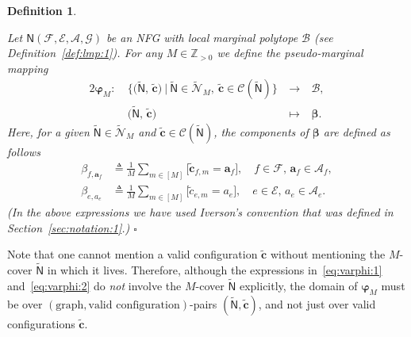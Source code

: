 \documentclass[journal, twocolumn]{IEEEtran}
\renewcommand{\mathbf}[1]{{\bm{#1}}}
\newcommand{\Z}{\mathbb{Z}}
\newcommand{\Zpp}{\Z_{>0}}
\newcommand{\vect}[1]{\mathbf{#1}}
\newcommand{\code}[1]{\mathcal{#1}}
\newcommand{\set}[1]{\mathcal{#1}}
\newcommand{\graph}[1]{\mathsf{#1}}
\newcommand{\defeq}{\triangleq}
\newcommand{\codeCedge}{\code{C}}
\newcommand{\bel}{\beta}
\newcommand{\vbel}{\boldsymbol{\bel}}
\newcommand{\setA}{\set{A}}
\newcommand{\setE}{\set{E}}
\newcommand{\setF}{\set{F}}
\newcommand{\setG}{\set{G}}
\newcommand{\va}{\vect{a}}
\newcommand{\cc}{\cover{c}}
\newcommand{\cvc}{\vect{\cover{c}}}
\newcommand{\lmpB}{\mathcal{B}}
\newcommand{\graphN}{\graph{N}}
\newcommand{\cover}[1]{\tilde{#1}}
\newcommand{\cset}[1]{\cover{\set{#1}}}
\newcommand{\cgraph}[1]{\cover{\graph{#1}}}
\newcommand{\?}{\mathrm{?}}
\newcommand{\varphiM}{\boldsymbol{\varphi}_{M}}
\newcommand{\qedwhite}{\hspace*{\fill}%
  $\square$\smallskip}
\newcommand{\defend}{\qedwhite}
\newtheorem{Definition}[Lemma]{Definition}
\begin{document}
\begin{Definition}
  \label{def:down:projection:1}

  Let $\graphN(\setF,\setE, \setA, \setG)$ be an NFG with local marginal
  polytope $\lmpB$ (see Definition~\ref{def:lmp:1}). For any $M \in \Zpp$ we
  define the pseudo-marginal mapping
  \begin{alignat*}{2}
    \varphiM: \ 
    &
    \Big\{
      \big(
        \cgraph{N}, \, 
        \cvc
      \big)
      \ \Big| \ 
        \cgraph{N} \in \cset{N}_{M}, \ 
        \cvc \in \codeCedge(\cgraph{N})
    \Big\}
      &\ \to \ & \lmpB, \\
    &
    \big(
      \cgraph{N}, \,
      \cvc
    \big)
      &\ \mapsto\ &
         \vbel.
  \end{alignat*}
  Here, for a given $\cgraph{N} \in \cset{N}_M$ and $\cvc \in
  \codeCedge(\cgraph{N})$, the components of $\vbel$ are defined as
  follows
  \begin{align}
    \bel_{f, \va_f}
      &\defeq
         \frac{1}{M}
         \sum_{m \in [M]}
           \big[ \cvc_{f,m} \! = \! \va_f \big],
             \quad f \in \setF, \, \va_f \in \setA_f,
             \label{eq:varphi:1} \\
    \bel_{e, a_e}
      &\defeq
         \frac{1}{M}
         \sum_{m \in [M]}
           \big[ \cc_{e,m} \! = \! a_e \big],
             \quad e \in \setE, \, a_e \in \setA_e.
             \label{eq:varphi:2}
  \end{align}
  (In the above expressions we have used Iverson's convention that was defined
  in Section~\ref{sec:notation:1}.)
  \defend
\end{Definition}


Note that one cannot mention a valid configuration $\cvc$ without mentioning
the $M$-cover $\cgraph{N}$ in which it lives. Therefore, although the
expressions in~\eqref{eq:varphi:1} and~\eqref{eq:varphi:2} do \emph{not}
involve the $M$-cover $\cgraph{N}$ explicitly, the domain of $\varphiM$ must
be over $( \text{graph},\text{valid configuration})$-pairs $(\cgraph{N},
\cvc)$, and not just over valid configurations $\cvc$.
\end{document}
